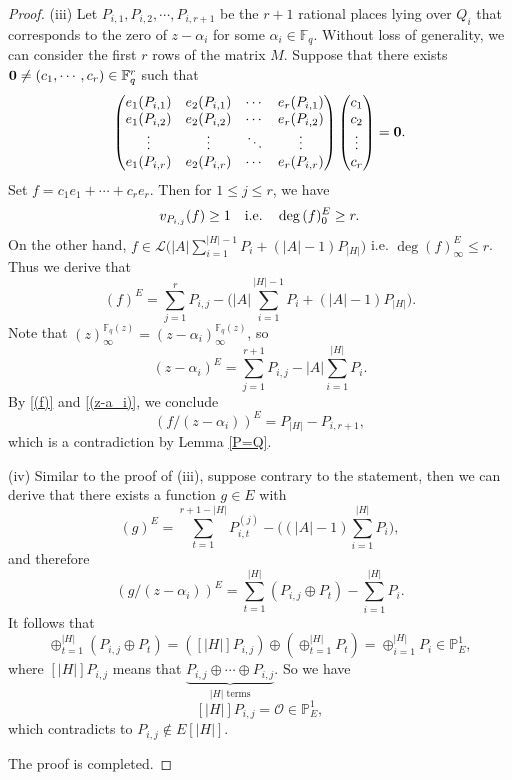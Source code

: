\documentclass[journal,12pt,onecolumn]{IEEEtran}
\begin{document}
\begin{proof}
    (iii) Let $P_{i,1},P_{i,2},\cdots,P_{i,r+1}$ be the $r+1$ rational places lying over $Q_i$ that corresponds to the zero of $z-\alpha_i$ for some $\alpha_i\in\mathbb{F}_q$. Without loss of generality, we can consider the first $r$ rows of the matrix $M$. Suppose that there exists ${\bf 0}\neq(c_1,\cdots,c_r)\in\mathbb{F}_q^r$ such that
    \[
        \begin{pmatrix}
        e_1(P_{i,1}) & e_2(P_{i,1}) & \cdots & e_r(P_{i,1}) \\
        e_1(P_{i,2}) & e_2(P_{i,2}) & \cdots & e_r(P_{i,2}) \\
        \vdots & \vdots & \ddots & \vdots \\
        e_1(P_{i,r}) & e_2(P_{i,r}) & \cdots & e_r(P_{i,r})
        \end{pmatrix}
        \begin{pmatrix}
        c_1 \\
        c_2 \\
        \vdots \\
        c_r
        \end{pmatrix}={\bf 0}.
    \]
    Set $f=c_1e_1+\cdots+c_re_r$. Then for $1\le j \le r$, we have 
    \[
        v_{P_{i,j}}(f)\ge1\quad {\rm i.e.}\quad \deg\, (f)^E_0\ge r.
    \]
    On the other hand, $f\in\mathcal{L}\big(|A|\sum_{i = 1}^{|H|-1} P_i + (|A|-1)P_{|H|}\big)$ i.e. $\deg(f)^E_{\infty}\le r$. Thus we derive that
    \begin{equation}\label{(f)}
        (f)^E=\sum_{j=1}^rP_{i,j}-\bigg(|A|\sum_{i = 1}^{|H|-1} P_i + (|A|-1)P_{|H|}\bigg).
    \end{equation}
    Note that $(z)_\infty^{\mathbb{F}_q(z)}=(z-\alpha_i)_\infty^{\mathbb{F}_q(z)}$, so 
    \begin{equation}\label{(z-a_i)}
        (z-\alpha_i)^E=\sum_{j=1}^{r+1}P_{i,j}-|A|\sum_{i = 1}^{|H|} P_i.
    \end{equation}
    By \eqref{(f)} and \eqref{(z-a_i)}, we conclude
    \[
        (f/(z-\alpha_i))^E=P_{|H|}-P_{i,r+1},
    \]
    which is a contradiction by Lemma \ref{P=Q}.

    (iv) Similar to the proof of (iii), suppose contrary to the statement, then we can derive that there exists a function \( g\in E \) with
    \[
        (g)^E = \sum_{t=1}^{r+1-|H|}P^{(j)}_{i,t}-\bigg((|A|-1)\sum_{i = 1}^{|H|} P_i\bigg), 
    \]
    and therefore
    \[
         (g/(z-\alpha_i))^E=\sum_{t=1}^{|H|} (P_{i,j}\oplus P_t) - \sum_{i = 1}^{|H|} P_i. 
    \]
    It follows that
    \[
        \oplus_{t=1}^{|H|} (P_{i,j}\oplus P_t) = ([|H|]P_{i,j})\oplus (\oplus_{t = 1}^{|H|} P_t) = \oplus_{i = 1}^{|H|} P_i\in \mathbb{P}_E^1,
    \]
    where \([|H|]P_{i,j}\) means that \(\underbrace{P_{i,j}\oplus\cdots\oplus P_{i,j}}_{|H|\text{ terms}}\). So we have
    \[
        [|H|]P_{i,j} = \mathcal{O}\in \mathbb{P}_E^1,
    \]
    which contradicts to \(P_{i,j}\notin E[|H|]\). 

    The proof is completed. 
\end{proof}
\end{document}
